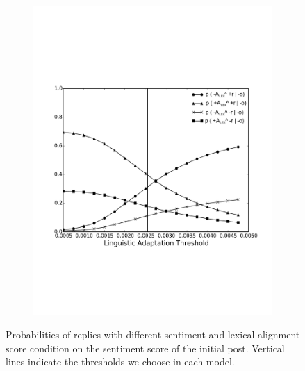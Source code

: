 \documentclass[man,biblatex,floatsintext]{apa6}
\newcommand{\up}{\vspace*{-12pt}}
\begin{document}
\begin{figure}[!htb]
\begin{subfigure}{.5\textwidth}
  \includegraphics[width=\linewidth]{Figures/LexAnegi_new_rob_New_Enlarge.pdf}
  \caption{\label{fig:ProbLexNego}}
\end{subfigure}%
\caption{Probabilities of replies with different sentiment and lexical alignment score condition on the sentiment score of the initial post. Vertical lines indicate the thresholds we choose in each model.}
\label{fig:Probability_Change_Lex}
\up
\end{figure}
\end{document}
